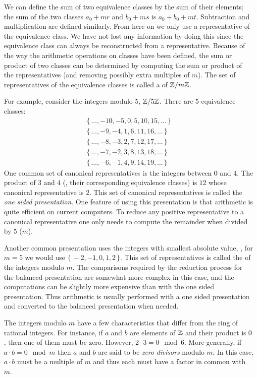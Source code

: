 We can define the sum of two equivalence classes by the sum of their
elements; the sum of the two classes $a_0 + mr$ and $b_0 + ms$ is $a_0
+ b_0 + mt$.  Subtraction and multiplication are defined similarly.
From here on we only use a representative of the equivalence class.
We have not lost any information by doing this since the equivalence
class can always be reconstructed from a representative.  Because of
the way the arithmetic operations on classes have been defined, the
sum or product of two classes can be determined by computing the sum
or product of the representatives (and removing possibly extra
multiples of $m$).  The set of representatives of the equivalence
classes is called a  of $\mathbb{Z}/m\mathbb{Z}$.

For example, consider the integers modulo $5$, $\mathbb{Z}/5\mathbb{Z}$.  There are 5
equivalence classes:
\[
\begin{array}{c}
\{\,\ldots, -10, -5, 0, 5, 10, 15, \ldots\,\} \\
\{\,\ldots, -9, -4, 1, 6, 11, 16, \ldots\,\} \\
\{\,\ldots, -8, -3, 2, 7, 12, 17, \ldots\,\} \\
\{\,\ldots, -7, -2, 3, 8, 13, 18, \ldots\,\} \\
\{\,\ldots, -6, -1, 4, 9, 14, 19, \ldots\,\}
\end{array}
\]
One common set of canonical representatives is the integers between
$0$ and $4$.  The product of $3$ and $4$ (\ie, their corresponding
equivalence classes) is $12$ whose canonical representative is $2$.
This set of canonical representatives is called the {\em one sided
presentation}. One feature of using this
presentation is that arithmetic is quite efficient on current
computers.  To reduce any positive representative to a canonical
representative one only needs to compute the remainder when divided by
$5$ ($m$).

Another common presentation uses the integers with smallest absolute
value, \ie, for $m = 5$ we would use $\{\,-2, -1, 0, 1, 2\,\}$.
This set of representatives is called the  of the integers modulo
$m$.  The comparisons required by the reduction process for the
balanced presentation are somewhat more complex in this case, and the
computations can be slightly more expensive than with the one sided
presentation.  Thus arithmetic is usually performed with a one sided
presentation and converted to the balanced presentation when needed.

The integers modulo $m$ have a few characteristics that differ from
the ring of rational integers.  For instance, if $a$ and $b$ are elements
of $\mathbb{Z}$ and their product is $0$, then one of them must be zero.
However, $2 \cdot 3 = 0 \mod{6}$.  More generally, if $a\cdot b = 0
\mod{m}$ then $a$ and $b$ are said to be {\em zero
divisors} modulo
$m$.  In this case, $a \cdot b$ must be a multiple of $m$ and thus
each must have a factor in common with $m$.

